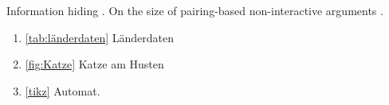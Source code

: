 \documentclass[12pt]{scrartcl}
\begin{document}
\exercise{}
Information hiding \cite{katzenbeisser2016information}.
On the size of pairing-based non-interactive arguments \cite{groth2016size}.


\exercise{}
\begin{enumerate}
\item \ref{tab:länderdaten} Länderdaten
\item \ref{fig:Katze} Katze am Husten
\item \ref{tikz} Automat.
\end{enumerate}





\end{document}
